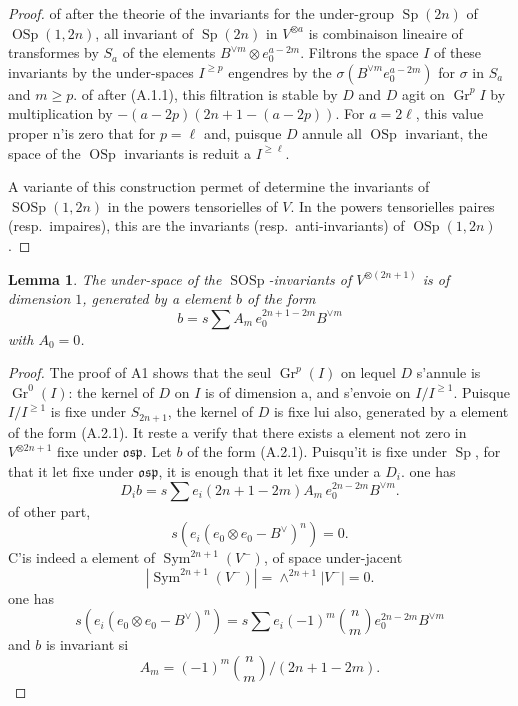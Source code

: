 \documentclass[11pt,a4paper]{article}
\theoremstyle{plain}
\newtheorem{lemma}[theorem]{Lemma}
\theoremstyle{definition}
\DeclareMathOperator{\Sym}{Sym}
\DeclareMathOperator{\Sp}{Sp}
\DeclareMathOperator{\OSp}{OSp}
\DeclareMathOperator{\SOSp}{SOSp}
\DeclareMathOperator{\Gr}{Gr}
\begin{document}
\begin{proof}
of after the theorie of the invariants for the under-group $\Sp(2n)$ of $\OSp(1, 2n)$, all invariant of $\Sp(2n)$ in $V^{\otimes a}$ is combinaison lineaire of transformes by $S_a$ of the elements $B^{\vee m} \otimes e_0^{a-2m}$. Filtrons the space $I$ of these invariants by the under-spaces $I^{\geq p}$ engendres by the $\sigma(B^{\vee m} e_0^{a-2m})$ for $\sigma$ in $S_a$ and $m \geq p$. of after (A.1.1), this filtration is stable by $D$ and $D$ agit on $\Gr^p I$ by multiplication by $-(a - 2p)(2n + 1 - (a - 2p))$. For $a = 2\ell$, this value proper n'is zero that for $p = \ell$ and, puisque $D$ annule all $\OSp$ invariant, the space of the $\OSp$ invariants is reduit a $I^{\geq \ell}$.

A variante of this construction permet of determine the invariants of $\SOSp(1, 2n)$ in the powers tensorielles of $V$. In the powers tensorielles paires (resp.~impaires), this are the invariants (resp.~anti-invariants) of $\OSp(1, 2n)$.
\end{proof}

\begin{lemma}
The under-space of the $\SOSp$-invariants of $V^{\otimes (2n+1)}$ is of dimension $1$, generated by a element $b$ of the form
\begin{equation}
b = s \sum A_m \, e_0^{2n+1-2m} B^{\vee m} \tag{A.2.1}
\end{equation}
with $A_0 = 0$.
\end{lemma}

\begin{proof}
The proof of A1 shows that the seul $\Gr^p(I)$ on lequel $D$ s'annule is $\Gr^0(I)$: the kernel of $D$ on $I$ is of dimension a, and s'envoie on $I/I^{\geq 1}$. Puisque $I/I^{\geq 1}$ is fixe under $S_{2n+1}$, the kernel of $D$ is fixe lui also, generated by a element of the form (A.2.1). It reste a verify that there exists a element not zero in $V^{\otimes 2n+1}$ fixe under $\mathfrak{osp}$. Let $b$ of the form (A.2.1). Puisqu'it is fixe under $\Sp$, for that it let fixe under $\mathfrak{osp}$, it is enough that it let fixe under a $D_i$. one has
\[
D_i b = s \sum e_i (2n + 1 - 2m) A_m \, e_0^{2n-2m} B^{\vee m}.
\]
of other part,
\[
s(e_i (e_0 \otimes e_0 - B^\vee)^n) = 0.
\]
C'is indeed a element of $\Sym^{2n+1}(V^-)$, of space under-jacent
\[
|\Sym^{2n+1}(V^-)| = \wedge^{2n+1} |V^-| = 0.
\]
one has
\[
s(e_i (e_0 \otimes e_0 - B^\vee)^n) = s \sum e_i (-1)^m \binom{n}{m} e_0^{2n-2m} B^{\vee m}
\]
and $b$ is invariant si
\begin{equation}
A_m = (-1)^m \binom{n}{m} / (2n + 1 - 2m). \tag{A.2.2}
\end{equation}
\end{proof}
\end{document}
